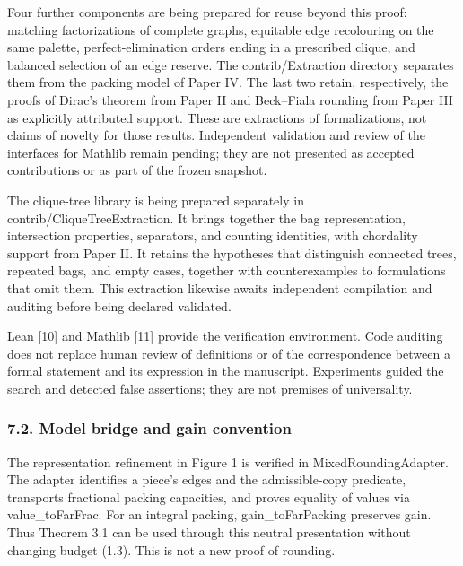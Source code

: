 \documentclass[english,11pt,a4paper]{article}
\begin{document}
Four further components are being prepared for reuse beyond this proof: matching factorizations of complete graphs, equitable edge recolouring on the same palette, perfect-elimination orders ending in a prescribed clique, and balanced selection of an edge reserve. The {\ttfamily\small contrib/\discretionary{\hbox{\ensuremath{\hookrightarrow}}}{}{}Extraction} directory separates them from the packing model of Paper IV. The last two retain, respectively, the proofs of Dirac's theorem from Paper II and Beck--Fiala rounding from Paper III as explicitly attributed support. These are extractions of formalizations, not claims of novelty for those results. Independent validation and review of the interfaces for Mathlib remain pending; they are not presented as accepted contributions or as part of the frozen snapshot.

The clique-tree library is being prepared separately in {\ttfamily\small contrib/\discretionary{\hbox{\ensuremath{\hookrightarrow}}}{}{}CliqueTreeEx\discretionary{\hbox{\ensuremath{\hookrightarrow}}}{}{}traction}. It brings together the bag representation, intersection properties, separators, and counting identities, with chordality support from Paper II. It retains the hypotheses that distinguish connected trees, repeated bags, and empty cases, together with counterexamples to formulations that omit them. This extraction likewise awaits independent compilation and auditing before being declared validated.

Lean {[}10{]} and Mathlib {[}11{]} provide the verification environment. Code auditing does not replace human review of definitions or of the correspondence between a formal statement and its expression in the manuscript. Experiments guided the search and detected false assertions; they are not premises of universality.

\subsubsection{7.2. Model bridge and gain convention}\label{model-bridge-and-gain-convention}

The representation refinement in Figure 1 is verified in {\ttfamily\small MixedRoundin\discretionary{\hbox{\ensuremath{\hookrightarrow}}}{}{}gAdapter}. The adapter identifies a piece's edges and the admissible-copy predicate, transports fractional packing capacities, and proves equality of values via {\ttfamily\small value\_\discretionary{\hbox{\ensuremath{\hookrightarrow}}}{}{}toFarFrac}. For an integral packing, {\ttfamily\small gain\_\discretionary{\hbox{\ensuremath{\hookrightarrow}}}{}{}toFarPacking} preserves gain. Thus Theorem 3.1 can be used through this neutral presentation without changing budget (1.3). This is not a new proof of rounding.
\end{document}
